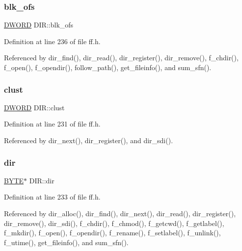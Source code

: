 \subsubsection{\texorpdfstring{blk\+\_\+ofs}{blk\_ofs}}
{\footnotesize\ttfamily \hyperlink{ff_8h_ad342ac907eb044443153a22f964bf0af}{D\+W\+O\+RD} D\+I\+R\+::blk\+\_\+ofs}



Definition at line 236 of file ff.\+h.



Referenced by dir\+\_\+find(), dir\+\_\+read(), dir\+\_\+register(), dir\+\_\+remove(), f\+\_\+chdir(), f\+\_\+open(), f\+\_\+opendir(), follow\+\_\+path(), get\+\_\+fileinfo(), and sum\+\_\+sfn().

\mbox{\label{structDIR_acfbb8ba2d6e73b6f999ceffd1857c190}} 
\subsubsection{\texorpdfstring{clust}{clust}}
{\footnotesize\ttfamily \hyperlink{ff_8h_ad342ac907eb044443153a22f964bf0af}{D\+W\+O\+RD} D\+I\+R\+::clust}



Definition at line 231 of file ff.\+h.



Referenced by dir\+\_\+next(), dir\+\_\+register(), and dir\+\_\+sdi().

\mbox{\label{structDIR_a6c2a8c0cf2d55ae99775e93a16593449}} 
\subsubsection{\texorpdfstring{dir}{dir}}
{\footnotesize\ttfamily \hyperlink{ff_8h_a4ae1dab0fb4b072a66584546209e7d58}{B\+Y\+TE}$\ast$ D\+I\+R\+::dir}



Definition at line 233 of file ff.\+h.



Referenced by dir\+\_\+alloc(), dir\+\_\+find(), dir\+\_\+next(), dir\+\_\+read(), dir\+\_\+register(), dir\+\_\+remove(), dir\+\_\+sdi(), f\+\_\+chdir(), f\+\_\+chmod(), f\+\_\+getcwd(), f\+\_\+getlabel(), f\+\_\+mkdir(), f\+\_\+open(), f\+\_\+opendir(), f\+\_\+rename(), f\+\_\+setlabel(), f\+\_\+unlink(), f\+\_\+utime(), get\+\_\+fileinfo(), and sum\+\_\+sfn().

